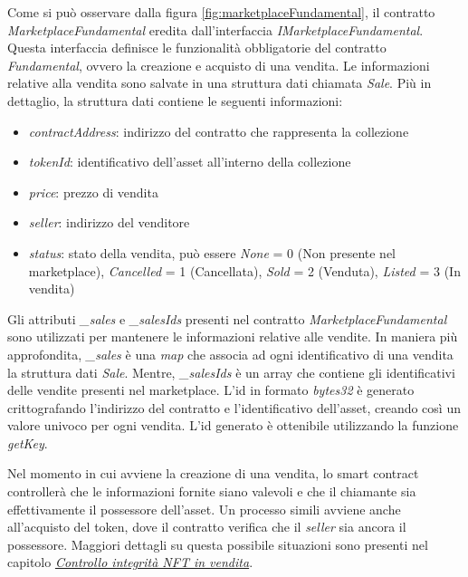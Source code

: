Come si può osservare dalla figura \ref{fig:marketplaceFundamental}, il contratto \textit{MarketplaceFundamental} eredita dall'interfaccia \textit{IMarketplaceFundamental}. Questa interfaccia definisce le funzionalità obbligatorie del contratto \textit{Fundamental}, ovvero la creazione e acquisto di una vendita. Le informazioni relative alla vendita sono salvate in una struttura dati chiamata \textit{Sale}. Più in dettaglio, la struttura dati contiene le seguenti informazioni:

\begin{itemize}
    \item \textit{contractAddress}: indirizzo del contratto che rappresenta la collezione
    \item \textit{tokenId}: identificativo dell'asset all'interno della collezione
    \item \textit{price}: prezzo di vendita
    \item \textit{seller}: indirizzo del venditore
    \item \textit{status}: stato della vendita, può essere \textit{None} = 0 (Non presente nel marketplace), \textit{Cancelled} = 1 (Cancellata), \textit{Sold} = 2 (Venduta), \textit{Listed} = 3 (In vendita)
\end{itemize}

Gli attributi \textit{\_sales} e \textit{\_salesIds} presenti nel contratto \textit{MarketplaceFundamental} sono utilizzati per mantenere le informazioni relative alle vendite. In maniera più approfondita, \textit{\_sales} è una \textit{map} che associa ad ogni identificativo di una vendita la struttura dati \textit{Sale}. Mentre, \textit{\_salesIds} è un array che contiene gli identificativi delle vendite presenti nel marketplace. L'id in formato \textit{bytes32} è generato crittografando l'indirizzo del contratto e l'identificativo dell'asset, creando così un valore univoco per ogni vendita. L'id generato è ottenibile utilizzando la funzione \textit{getKey}. 

Nel momento in cui avviene la creazione di una vendita, lo smart contract controllerà che le informazioni fornite siano valevoli e che il chiamante sia effettivamente il possessore dell'asset. Un processo simili avviene anche all'acquisto del token, dove il contratto verifica che il \textit{seller} sia ancora il possessore. Maggiori dettagli su questa possibile situazioni sono presenti nel capitolo \hyperref[sec:controllo-integrita-nft-in-vendita]{\textit{Controllo integrità NFT in vendita}}.

